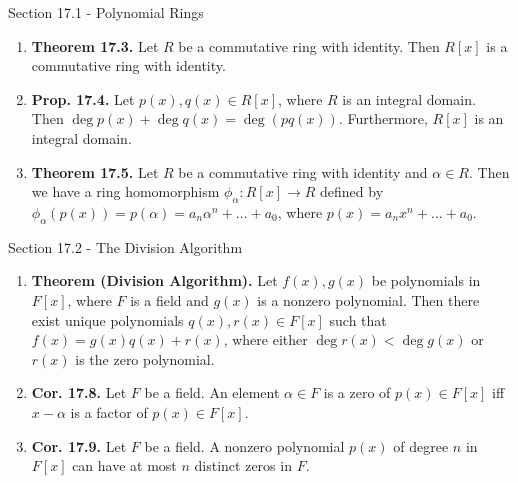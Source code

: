 \documentclass[12pt]{article}
\theoremstyle{definition}
\theoremstyle{named}
\begin{document}
\begin{section}{Section 17.1 - Polynomial Rings}
    \begin{enumerate}
        \item \textbf{Theorem 17.3. } Let $R$ be a commutative ring with identity. Then $R[x]$ is a commutative ring with identity. 
        \item \textbf{Prop. 17.4. } Let $p(x),q(x) \in R[x]$, where $R$ is an integral domain. Then $\deg p(x) + \deg q(x) = \deg(pq(x))$. Furthermore, $R[x]$ is an integral domain. 
        \item \textbf{Theorem 17.5. } Let $R$ be a commutative ring with identity and $\alpha \in R$. Then we have a ring homomorphism $\phi_\alpha: R[x] \to R$ defined by $\phi_\alpha(p(x)) = p(\alpha) = a_n\alpha^n + \dots + a_0$, where $p(x) = a_nx^n + \dots + a_0$. 
    \end{enumerate}
\end{section}

\begin{section}{Section 17.2 - The Division Algorithm}
    \begin{enumerate}
        \item \textbf{Theorem (Division Algorithm). } Let $f(x),g(x)$ be polynomials in $F[x]$, where $F$ is a field and $g(x)$ is a nonzero polynomial. Then there exist unique polynomials $q(x),r(x) \in F[x]$ such that $f(x) = g(x)q(x)+r(x)$, where either $\deg r(x) < \deg g(x)$ or $r(x)$ is the zero polynomial. 
        \item \textbf{Cor. 17.8. } Let $F$ be a field. An element $\alpha \in F$ is a zero of $p(x) \in F[x]$ iff $x-\alpha$ is a factor of $p(x) \in F[x]$. 
        \item \textbf{Cor. 17.9. } Let $F$ be a field. A nonzero polynomial $p(x)$ of degree $n$ in $F[x]$ can have at most $n$ distinct zeros in $F$. 
    \end{enumerate}
\end{section}
\end{document}
